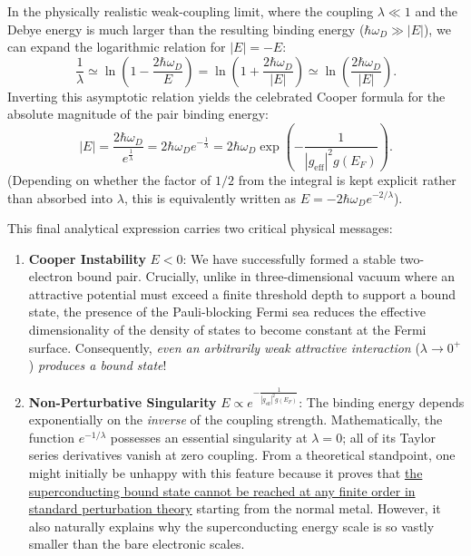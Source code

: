 In the physically realistic weak-coupling limit, where the coupling \( \lambda \ll 1 \) and the Debye energy is much larger than the resulting binding energy (\( \hbar\omega_D \gg |E| \)), we can expand the logarithmic relation for \( |E| = -E \):
\[
    \frac{1}{\lambda} \simeq \ln\left( 1 - \frac{2\hbar\omega_D}{E} \right) = \ln\left( 1 + \frac{2\hbar\omega_D}{|E|} \right) \simeq \ln\left( \frac{2\hbar\omega_D}{|E|} \right).
\]
Inverting this asymptotic relation yields the celebrated Cooper formula for the absolute magnitude of the pair binding energy:
\begin{equation} \label{eq:cooper_binding_energy}
    |E| = \frac{2\hbar\omega_D}{e^{\frac{1}{\lambda}}} = 2\hbar\omega_D e^{-\frac{1}{\lambda}} = 2\hbar\omega_D \exp\left( -\frac{1}{|g_{\text{eff}}|^2 g(E_F)} \right).
\end{equation}
(Depending on whether the factor of \( 1/2 \) from the integral is kept explicit rather than absorbed into \( \lambda \), this is equivalently written as \( E = -2\hbar\omega_D e^{-2/\lambda} \)).

This final analytical expression carries two critical physical messages:
\begin{enumerate}
    \item \textbf{Cooper Instability} \( E < 0 \): We have successfully formed a stable two-electron bound pair. Crucially, unlike in three-dimensional vacuum where an attractive potential must exceed a finite threshold depth to support a bound state, the presence of the Pauli-blocking Fermi sea reduces the effective dimensionality of the density of states to become constant at the Fermi surface. Consequently, \textit{even an arbitrarily weak attractive interaction} (\( \lambda \to 0^+ \)) \textit{produces a bound state}!
    \item \textbf{Non-Perturbative Singularity} \( E \propto e^{-\frac{1}{|g_{\text{eff}}|^2 g(E_F)}} \): The binding energy depends exponentially on the \textit{inverse} of the coupling strength. Mathematically, the function \( e^{-1/\lambda} \) possesses an essential singularity at \( \lambda = 0 \); all of its Taylor series derivatives vanish at zero coupling. From a theoretical standpoint, one might initially be unhappy with this feature because it proves that \uline{the superconducting bound state cannot be reached at any finite order in standard perturbation theory} starting from the normal metal. However, it also naturally explains why the superconducting energy scale is so vastly smaller than the bare electronic scales.
\end{enumerate}

